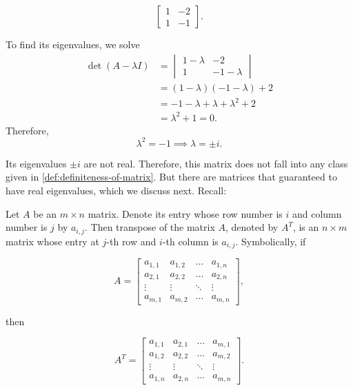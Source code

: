 \begin{equation}
	\begin{bmatrix} 1 & -2\\1 & -1 \end{bmatrix}.
	\label{eq:review-on-linear-algebra-continued-2}
\end{equation}

To find its eigenvalues, we solve
\begin{align*}
	\det(A-\lambda I)
	 & = \begin{vmatrix}
		     1-\lambda & -2         \\
		     1         & -1-\lambda
	     \end{vmatrix}         \\
	 & = (1-\lambda)(-1-\lambda)+2      \\
	 & = -1-\lambda+\lambda+\lambda^2+2 \\
	 & = \lambda^2+1=0.
\end{align*}
Therefore,
\[
	\lambda^2=-1
	\implies \lambda=\pm i.
\]

Its eigenvalues \( \pm i \) are not real. Therefore, this matrix does not fall into any class given in \autoref{def:definiteness-of-matrix}. But there are matrices that guaranteed to have real eigenvalues, which we discuss next. Recall:

\begin{definition}
	Let \( A \) be an \( m \times n \) matrix. Denote its entry whose row number is \( i \) and column number is \( j \) by \( a_{i,j} \). Then transpose of the matrix \( A \), denoted by \( A^T \), is an \( n \times m \) matrix whose entry at \( j \)-th row and \( i \)-th column is \( a_{i,j} \). Symbolically, if

	\begin{equation}
		A = \begin{bmatrix} a_{1,1} & a_{1,2} & \ldots & a_{1,n}\\ a_{2,1} & a_{2,2} & \ldots & a_{2,n} \\ \vdots & \vdots & \ddots & \vdots\\ a_{m,1} & a_{m,2} & \ldots & a_{m,n} \end{bmatrix},
		\label{eq:transpose-of-a-matrix-1}
	\end{equation}

	then

	\begin{equation}
		A^T = \begin{bmatrix} a_{1,1} & a_{2,1} & \ldots & a_{m,1}\\ a_{1,2} & a_{2,2} & \ldots & a_{m,2} \\ \vdots & \vdots & \ddots & \vdots\\ a_{1,n} & a_{2,n} & \ldots & a_{m,n} \end{bmatrix}.
		\label{eq:transpose-of-a-matrix-2}
	\end{equation}
\end{definition}

